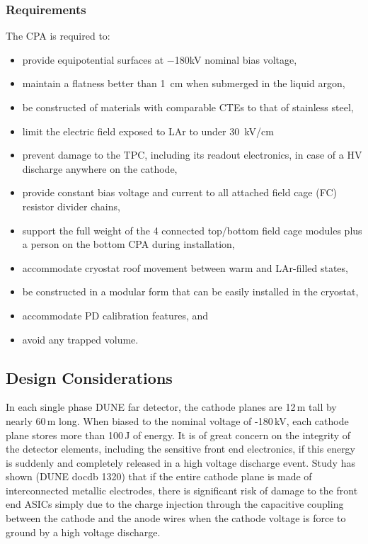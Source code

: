 \subsubsection{Requirements}
The CPA is required to:
\begin{itemize}
\item provide equipotential surfaces at $-$180kV nominal bias voltage,
\item maintain a flatness better than 1~cm when submerged in the liquid argon,
\item be constructed of materials with comparable CTEs to that of stainless steel, 
\item limit the electric field exposed to LAr to under 30~kV/cm 
\item prevent damage to the TPC, including its readout electronics, in case of a HV discharge anywhere on the cathode,
\item provide constant bias voltage and current to all attached field cage (FC) resistor divider chains,
\item support the full weight of the 4 connected top/bottom field cage modules plus a person on the bottom CPA during installation,
\item accommodate cryostat roof movement between warm and LAr-filled states,
\item be constructed in a modular form that can be easily installed in the cryostat,
\item accommodate PD calibration features, and
\item avoid any trapped volume.
\end{itemize}

\subsection{Design Considerations}

In each single phase DUNE far detector, the cathode planes are 12\,m tall by nearly 60\,m long.  When biased to the nominal voltage of -180\,kV, each cathode plane stores more than 100\,J of energy. It is of great concern on the integrity of the detector elements, including the sensitive front end electronics, if this energy is suddenly and completely released in a high voltage discharge event.  Study has shown (DUNE docdb 1320) that if the entire cathode plane is made of interconnected metallic electrodes, there is significant risk of damage to the front end ASICs simply due to the charge injection through the capacitive coupling between the cathode and the anode wires when the cathode voltage is force to ground by a high voltage discharge.  

